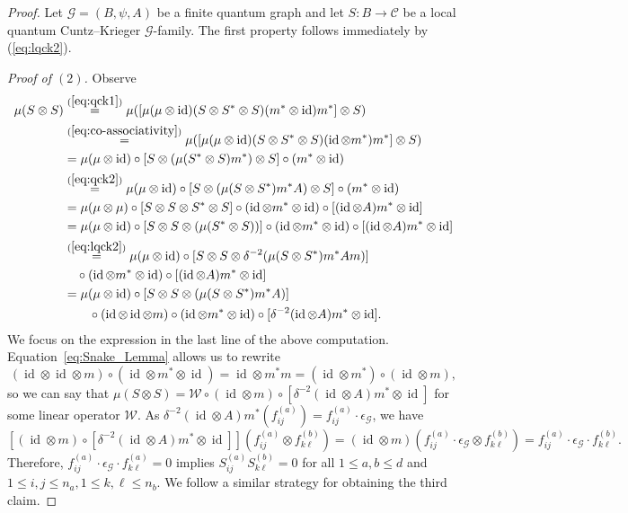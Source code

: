 \documentclass[11pt]{article}
\theoremstyle{plain}
\theoremstyle{nonumberplain}
\theoremstyle{plain}
\theoremstyle{nonumberplain}
\newtheorem{proof}{Proof.}
\DeclareMathOperator{\id}{id}
\newcommand\1{{\bf 1}}
\newcommand\cG{{\mathcal G}}
\newcommand{\<}{\left\langle}
\renewcommand{\>}{\right\rangle}
\begin{document}
\begin{proof}
    Let $\cG = (B,\psi,A)$ be a finite quantum graph and let $S:B\to \mathcal{C}$ be a local quantum Cuntz--Krieger $\cG$-family. The first property follows immediately by (\ref{eq:lqck2}).

{\em Proof of $(2)$.} Observe
    \begin{align*}
        \mu  (S\otimes S)
        &\overset{(\ref{eq:qck1})}{=}
        \mu  ([\mu   (\mu \otimes \id)   (S\otimes S^*\otimes S)  (m^*\otimes \id)  m^*]\otimes S) \\
        &\overset{(\ref{eq:co-associativity})}{=}
        \mu  ([\mu   (\mu \otimes \id)   (S\otimes S^*\otimes S)  ( \id\otimes m^*)  m^*]\otimes S) \\
        &= \mu   (\mu\otimes \id)  \circ [ S\otimes(\mu   (S^*\otimes S)   m^* ) \otimes S]  \circ (m^*\otimes \id) \\
        &\overset{(\ref{eq:qck2})}{=} \mu   (\mu\otimes \id) \circ   [ S\otimes(\mu   (S\otimes S^*)   m^*   A) \otimes S]   \circ(m^*\otimes \id) \\
        &= \mu   (\mu\otimes \mu)  \circ [ S\otimes S\otimes S^* \otimes S]  \circ
        (\id \otimes m^* \otimes \id)  \circ [(\id \otimes A)  m^* \otimes \id] \\
        &= \mu   (\mu\otimes \id) \circ  [ S\otimes S\otimes (\mu  (S^* \otimes S))] \circ (\id \otimes m^* \otimes \id)  \circ [(\id \otimes A)  m^* \otimes \id]\\
        &\overset{(\ref{eq:lqck2})}{=} \mu   (\mu\otimes \id) \circ   [ S\otimes S\otimes \delta^{-2}(\mu  (S \otimes S^*)  m^*  A  m)]  \\
        & \quad  \circ (\id \otimes m^* \otimes \id)  \circ [(\id \otimes A)  m^*\otimes \id] \\
       &= \mu   (\mu\otimes \id)  
       \circ
       [ S\otimes S\otimes (\mu  (S \otimes S^*)  m^*  A)] \\
        & \quad \quad  \circ (\id \otimes \id \otimes m) \circ   (\id \otimes m^* \otimes \id)  \circ  [\delta^{-2}(\id \otimes A)  m^* \otimes \id].
    \end{align*}
    We focus on the expression in the last line of the above computation. Equation~\ref{eq:Snake_Lemma} allows us to rewrite
    \[
    (\id \otimes \id \otimes m)\circ (\id\otimes m^*\otimes \id)
    =
    \id \otimes m^*m
    =
    (\id\otimes m^*)\circ (\id \otimes m),
    \]
    so we can say that $\mu(S\otimes S) = \mathcal{W}\circ (\id \otimes m)\circ [\delta^{-2}(\id \otimes A)m^*\otimes \id]$ for some linear operator $\mathcal{W}$. 
    As $\delta^{-2}(\id \otimes A)m^*(f_{ij}^{(a)})=f_{ij}^{(a)}\cdot \epsilon_\cG$, we have
    \[
    \left[(\id \otimes m) \circ [\delta^{-2}(\id\otimes A)  m^* \otimes \id]\right](f^{(a)}_{ij}\otimes f^{(b)}_{k\ell}) 
    = (\id \otimes m)(f^{(a)}_{ij}\cdot \epsilon_\cG\otimes f^{(b)}_{k\ell}) 
    = f^{(a)}_{ij}\cdot \epsilon_{\cG}\cdot f^{(b)}_{k\ell}.
    \]
Therefore, $f^{(a)}_{ij}\cdot \epsilon_{\cG}\cdot f^{(a)}_{k\ell}=0$ implies $S^{(a)}_{ij}S^{(b)}_{k\ell}=0$ for all $1\leq a,b\leq d$ and $1\leq i,j\leq n_a,1\leq k,\ell\leq n_b.$ We follow a similar strategy for obtaining the third claim. 


\end{proof}
\end{document}
